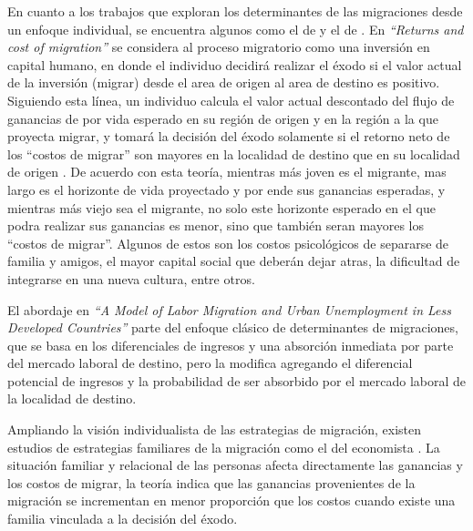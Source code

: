 \documentclass[12pt,a4paper]{article}
\begin{document}
En cuanto a los trabajos que exploran los determinantes de las migraciones desde un enfoque individual, se encuentra algunos como el de \textcite{sjaastad_costs_1962} y el de \textcite{todaro_model_1969}. En \textit{``Returns and cost of migration''} \parencite{sjaastad_costs_1962} se considera al proceso migratorio como una inversión en capital humano, en donde el individuo decidirá realizar el éxodo si el valor actual de la inversión (migrar) desde el area de origen al area de destino es positivo.  Siguiendo esta línea, un individuo calcula el valor actual descontado del flujo de ganancias de por vida esperado en su región de origen y en la región a la que proyecta migrar, y tomará la decisión del éxodo solamente si el retorno neto de los ``costos de migrar'' son mayores en la localidad de destino que en su localidad de origen \parencite{zaiceva_impact_2014}. De acuerdo con esta teoría, mientras más joven es el migrante, mas largo es el horizonte de vida proyectado y por ende sus ganancias esperadas, y mientras más viejo sea el migrante, no solo este horizonte esperado en el que podra realizar sus ganancias es menor, sino que también seran mayores  los ``costos de migrar''. Algunos de estos son los costos psicológicos de separarse de familia y amigos, el mayor capital social que deberán dejar atras, la dificultad de integrarse en una nueva cultura, entre otros.

El abordaje en \textit{``A Model of Labor Migration and Urban Unemployment in Less Developed Countries''} \parencite{todaro_model_1969} parte del enfoque clásico de determinantes de migraciones, que se basa en los diferenciales de ingresos y una absorción inmediata por parte del mercado laboral de destino, pero la modifica agregando el diferencial potencial de ingresos y la probabilidad de ser absorbido por el mercado laboral de la localidad de destino. 

Ampliando la visión individualista de las estrategias de migración, existen estudios de estrategias familiares de la migración como el del economista \textcite{mincer_family_1978}. La situación familiar y relacional de las personas afecta directamente las ganancias y los costos de migrar, la teoría indica que las ganancias provenientes de la migración se incrementan en menor proporción que los costos cuando existe una familia vinculada a la decisión del éxodo. 
\end{document}
